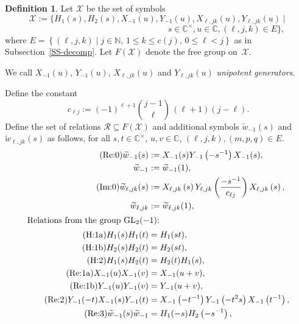 \documentclass[11pt,letterpaper]{amsart}
\newcounter{thecounter}
\numberwithin{thecounter}{section}
\theoremstyle{definition}
\newtheorem{defn}[thecounter]{Definition}
\DeclareMathOperator{\GL}{GL}
\newcommand{\C}{{\mathbb C}}
\newcommand{\N}{{\mathbb N}}
\begin{document}
\begin{defn}\label{Defn}
Let $\mathcal{X}$ be the set of symbols
$$\mathcal{X} :=\{H_1(s), H_2(s), X_{-1}(u),  Y_{-1}(u), X_{\ell,jk}(u), Y_{\ell,jk}(u) \mid$$ 
$$\qquad \qquad \qquad \qquad\qquad \qquad \qquad \qquad s\in \C^\times, u\in \C, (\ell,j,k)\in E\},$$
where $E=  \left\{(\ell,j,k)\mid j\in\N,\, 1 \leq k\leq c(j),\, 0\leq \ell<j \right\}$ as in Subsection~\ref{SS-decomp}. Let $F(\mathcal{X})$ denote the free group on~$\mathcal{X}$.

We  call  $X_{-1}(u)$, $Y_{-1}(u)$, $X_{\ell,jk}(u)$ and $Y_{\ell,jk}(u)$ \emph{unipotent generators}.


Define the constant
$$c_{\ell j} := (-1)^{\ell+1} \binom{j-1}{\ell} \, (\ell+1)(j-\ell).$$
Define the set of relations $\mathcal{R}\subseteq F(\mathcal{X})$  and additional symbols $ \widetilde{w}_{-1}(s)$ and   $\widetilde{w}_{\ell,jk}(s)$ as follows, for all $s,t\in \C^\times$, $u,v\in \C$, $(\ell,j,k),(m,p,q) \in E$.
\begingroup\allowdisplaybreaks
\begin{align*}
\tag{Re:0}\label{GL2-G-wdefn} 
  \widetilde{w}_{-1}(s) &:= X_{-1}(s) Y_{-1}\left(-s^{-1} \right) X_{-1}(s), \\ \widetilde{w}_{-1} &:= \widetilde{w}_{-1}(1),\\
\tag{Im:0}\label{G-wdefn}
  \widetilde{w}_{\ell,jk}(s) &:= X_{\ell,jk}\left({s}\right) Y_{\ell,jk}\left(\frac{-s^{-1}}{{c_{\ell j}}}\right) 
  X_{\ell,jk}\left({s}\right),\\  \widetilde{w}_{\ell,jk} &:= \widetilde{w}_{\ell,jk}(1),\\
\intertext{Relations from the group $\GL_2(-1)$:}
\tag{H:1a}\label{GL2-G-H1H1}
   H_1(s)H_1(t)&=H_1(st),\\
\tag{H:1b}\label{GL2-G-H2H2}
   H_2(s)H_2(t)&=H_2(st),\\
\tag{H:2}\label{GL2-G-H1H2}
    H_1(s)H_2(t)&=H_2(t)H_1(s),\\
\tag{Re:1a}\label{GL2-G-XX}
   X_{-1}(u)X_{-1}(v)&=X_{-1}(u+v),\\
\tag{Re:1b}\label{GL2-G-YY}
   Y_{-1}(u)Y_{-1}(v)&=Y_{-1}(u+v),\\
\tag{Re:2}\label{GL2-G-XY}
  Y_{-1}(-t)X_{-1}(s)Y_{-1}(t)&= X_{-1}\left(-t^{-1}\right) Y_{-1}\left(-t^{2}s \right)X_{-1}\left(t^{-1} \right),\\ 
\tag{Re:3}\label{GL2-G-wwH}
  \widetilde{w}_{-1}(s)\widetilde{w}_{-1}&=H_1(-s)H_2\left(-s^{-1} \right), \\

\end{align*}
\end{defn}
\end{document}
